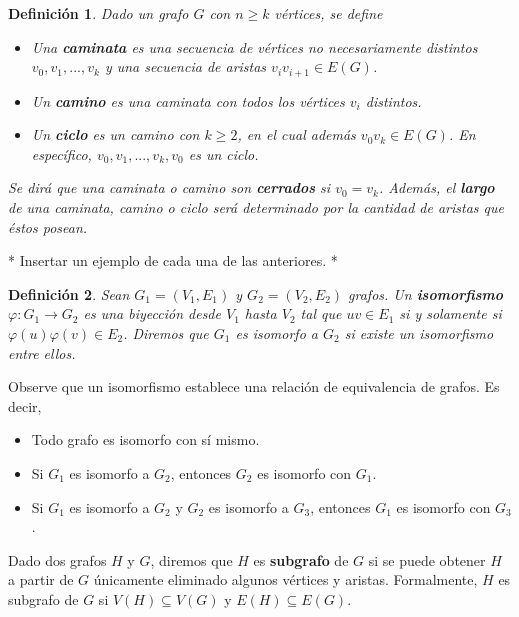 \documentclass{article}[14pts]
\newcommand{\hh}[1]{{\color{red} * #1 *}}
\newtheorem{definicion}{Definición}
\begin{document}
\begin{definicion}
    Dado un grafo $G$ con  $n\geq k$ vértices, se define
    \begin{itemize}
        \item Una \textbf{caminata} es una secuencia de vértices no necesariamente distintos $v_0,v_1,...,v_k$ y  una secuencia de aristas $v_{i}v_{i+1}\in E(G)$.
        \item Un \textbf{camino} es una caminata con todos los vértices $v_i$ distintos.
        \item Un \textbf{ciclo} es un camino con $k\geq 2$, en el cual además $v_{0}v_{k}\in E(G)$. En específico, $v_0, v_1,...,v_k,v_0$ es un ciclo.
    \end{itemize}

    Se dirá que una caminata o camino son \textbf{cerrados} si $v_0 = v_k$. Además, el \textbf{largo} de una caminata, camino o ciclo será determinado por la cantidad de aristas que éstos posean.
\end{definicion}

\hh{Insertar un ejemplo de cada una de las anteriores.}

\begin{definicion}
    Sean $G_1 = (V_1, E_1)$ y $G_2 = (V_2, E_2)$ grafos. Un \textbf{isomorfismo} $\varphi : G_1 \to G_2$ es una biyección desde $V_1$ hasta $V_2$ tal que $uv\in E_1$ si y solamente si $\varphi(u)\varphi(v)\in E_2$. Diremos que $G_1$ es isomorfo a $G_2$ si existe un isomorfismo entre ellos.
\end{definicion}

Observe que un isomorfismo establece una relación de equivalencia de grafos. Es decir,
\begin{itemize}
    \item Todo grafo es isomorfo con sí mismo.
    \item Si $G_1$ es isomorfo a $G_2$, entonces $G_2$ es isomorfo con $G_1$.
    \item Si $G_1$ es isomorfo a $G_2$ y $G_2$ es isomorfo a $G_3$, entonces $G_1$ es isomorfo con $G_3$.
\end{itemize}

Dado dos grafos $H$ y $G$, diremos que $H$ es \textbf{subgrafo} de $G$ si se puede obtener $H$ a partir de $G$ únicamente eliminado algunos vértices y aristas. Formalmente, $H$ es subgrafo de $G$ si $V(H)\subseteq V(G)$ y $E(H)\subseteq E(G)$.
\end{document}
